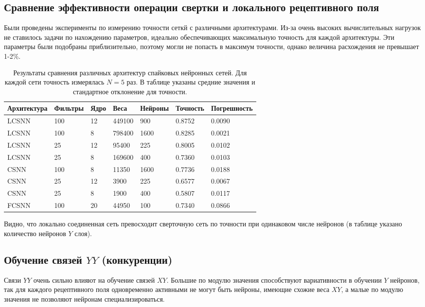 \documentclass[a4paper]{article}
\begin{document}
\subsection{Сравнение эффективности операции свертки и локального рецептивного поля}
Были проведены эксперименты по измерению точности сеткй с различными архитектурами. Из-за очень высоких вычислительных нагрузок не ставилось задачи по нахождению параметров, идеально обеспечивающих максимальную точность для каждой архитектуры. Эти параметры были подобраны приблизительно, поэтому могли не попасть в максимум точности, однако величина расхождения не превышает 1-2\%.

\begin{table}[H]
 \caption{Результаты сравнения различных архитектур спайковых нейронных сетей. Для каждой сети точность измерялась $N=5$ раз. В таблице указаны средние значения и стандартное отклонение для точности.}
\begin{center}
\begin{tabular}{|l|l|l|l|l|l|l|}
\hline
Архитектура & Фильтры & Ядро & Веса & Нейроны & Точность & Погрешность\\
\hline
{LCSNN} & {100} & {12} & {449100} & {900} & {0.8752} & {0.0090}\\
\hline
{LCSNN} & {100} & {8} & {798400} & {1600} & {0.8285} & {0.0021}\\
\hline
{LCSNN} & {25} & {12} & {95400} & {225} & {0.8005} & {0.0102}\\
\hline
{LCSNN} & {25} & {8} & {169600} & {400} & {0.7360} & {0.0103}\\
\hline
{CSNN} & {100} & {8} & {11350} & {1600} & {0.7736} & {0.0188}\\
\hline
{CSNN} & {25} & {12} & {3900} & {225} & {0.6577} & {0.0067}\\
\hline
{CSNN} & {25} & {8} & {1900} & {400} & {0.5807} & {0.0117}\\
\hline
{FCSNN} & {100} & {20} & {44950} & {100} & {0.7340} & {0.0866}\\
\hline
\end{tabular}
\end{center}
\end{table}

Видно, что локально соединенная сеть превосходит сверточную сеть по точности при одинаковом числе нейронов (в таблице указано количество нейронов $Y$ слоя). 

\subsection{Обучение связей $YY$ (конкуренции)}
Связи $YY$ очень сильно влияют на обучение связей $XY$. Большие по модулю значения способствуют вариативности в обучении $Y$ нейронов, так для каждого рецептивного поля одновременно активными не могут быть нейроны, имеющие схожие веса $XY$, а малые по модулю значения не позволяют нейронам специализироваться.
\end{document}
